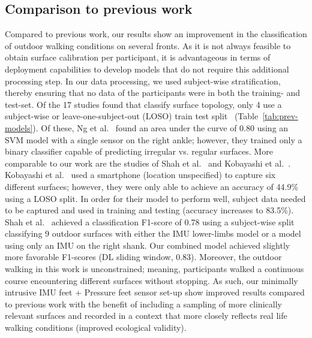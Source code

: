 \documentclass[sensors,article,submit,pdftex,moreauthors]{Definitions/mdpi}
\begin{document}

\subsection{Comparison to previous work}
Compared to previous work, our results show an improvement in the classification of outdoor walking conditions on several fronts.  As it is not always feasible to obtain surface calibration per participant, it is advantageous in terms of deployment capabilities to develop models that do not require this additional processing step. In our data processing, we used subject-wise stratification, thereby ensuring that no data of the participants were in both the training- and test-set. \textcolor{revision}{Of the 17 studies found that classify surface topology, only 4 use a subject-wise or leave-one-subject-out (LOSO) train test split~\cite{Shah_2022, ng2022machine, kobayashi2019estimation, worsey2021automatic} (Table~\ref{tab:prev-models}). Of these, Ng et al.~\cite{ng2022machine} found an area under the curve of 0.80 using an SVM model with a single sensor on the right ankle; however, they trained only a binary classifier capable of predicting irregular vs. regular surfaces. More comparable to our work are the studies of Shah et al.~\cite{Shah_2022} and Kobayashi et al.~\cite{kobayashi2019estimation}. Kobayashi et al.~\cite{kobayashi2019estimation} used a smartphone (location unspecified) to capture six different surfaces; however, they were only able to achieve an accuracy of 44.9\% using a LOSO split. In order for their model to perform well, subject data needed to be captured and used in training and testing (accuracy increases to 83.5\%). Shah et al.~\cite{Shah_2022} achieved a classification F1-score of 0.78 using a subject-wise split classifying 9 outdoor surfaces with either the IMU lower-limbs model or a model using only an IMU on the right shank. Our combined model achieved slightly more favorable F1-scores (DL sliding window, 0.83). Moreover, the outdoor walking in this work is unconstrained; meaning, participants walked a continuous course encountering different surfaces without stopping.}
\textcolor{revision}{As such, our minimally intrusive IMU feet + Pressure feet sensor set-up} show improved results compared to previous work with the benefit of including a sampling of more clinically relevant surfaces and recorded in a context that more closely reflects real life walking conditions (improved ecological validity).
\end{document}
